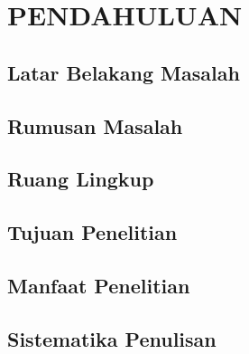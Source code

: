 \chapter{PENDAHULUAN}
\section{Latar Belakang Masalah}

\lipsum[1]

\section{Rumusan Masalah}

\lipsum[2]

\section{Ruang Lingkup}

\lipsum[3]

\section{Tujuan Penelitian}

\lipsum[4]

\section{Manfaat Penelitian}

\lipsum[5]

\section{Sistematika Penulisan}

